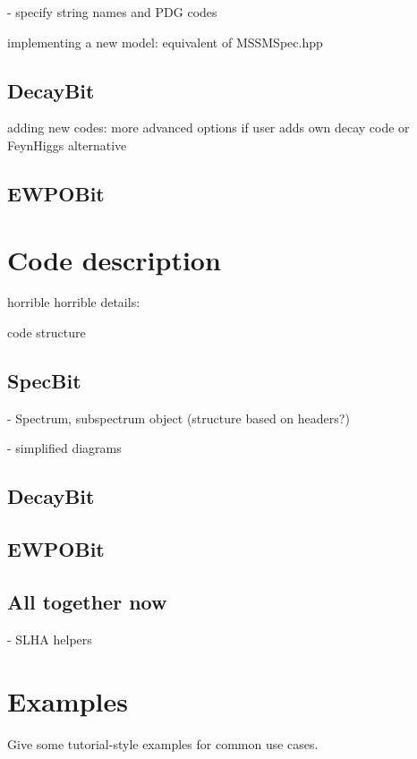 \documentclass[11pt,a4paper]{article}
\begin{document}
- specify string names and PDG codes

implementing a new model: equivalent of MSSMSpec.hpp


\subsection{DecayBit}

adding new codes: more advanced options if user adds own decay code or FeynHiggs alternative

\subsection{EWPOBit}



\section{Code description}

horrible horrible details:

code structure

\subsection{SpecBit}

- Spectrum, subspectrum object (structure based on headers?)

- simplified diagrams 

\subsection{DecayBit}


\subsection{EWPOBit}

\subsection{All together now}

- SLHA helpers



\section{Examples}
Give some tutorial-style examples for common use cases.
\end{document}
